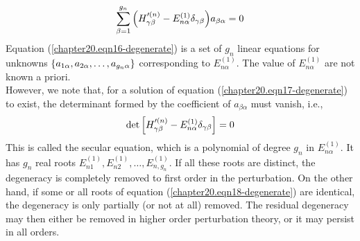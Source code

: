 	\begin{equation}
		\sum_{\beta=1}^{g_n} \qty(H^{\prime (n)}_{\gamma \beta}  -  E_{n\alpha}^{(1)}\delta_{\gamma \beta}) a_{\beta \alpha} = 0
		\label{chapter20.eqn17-degenerate}
	\end{equation}
	Equation (\ref{chapter20.eqn16-degenerate}) is a set of $g_n$ linear equations for unknowns $\qty{a_{1\alpha}, a_{2\alpha}, \ldots, a_{g_n \alpha}}$ corresponding to $E_{n\alpha}^{(1)}$. The value of $E_{n\alpha}^{(1)}$ are not known a priori.\\
		
		However, we note that, for a solution of equation (\ref{chapter20.eqn17-degenerate}) to exist, the determinant formed by the coefficient of $a_{\beta\alpha}$ must vanish, i.e.,
		\begin{equation}
			\det \qty[H^{\prime (n)}_{\gamma \beta}  -  E^{(1)}_{n\alpha} \delta_{\gamma \beta}] = 0
			\label{chapter20.eqn18-degenerate}
		\end{equation}
		This is called the secular equation, which is a polynomial of degree $g_n$ in $E_{n\alpha}^{(1)}$. It has $g_n$ real roots $E_{n 1}^{(1)}, E_{n 2}^{(1)}, \ldots, E_{n, g_n}^{(1)}$. If all these roots are distinct, the degeneracy is completely removed to first order in the perturbation. On the other hand, if some or all roots of equation (\ref{chapter20.eqn18-degenerate}) are identical, the degeneracy is only partially (or not at all) removed. The residual degeneracy may then either be removed in higher order perturbation theory, or it may persist in all orders.\\
		
